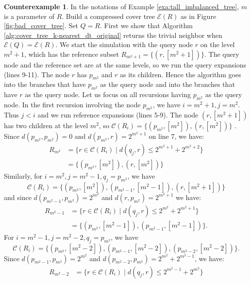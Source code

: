 \documentclass{vgtc}                          %
\numberwithin{algocf}{section}
\theoremstyle{definition}
\theoremstyle{definition}
\theoremstyle{definition}
\newtheorem{cexa}[algocf]{Counterexample}
\theoremstyle{plain}
\newcommand{\C}{\mathcal{C}}
\newcommand{\T}{\mathcal{E}}
\begin{document}
\begin{cexa}
	\label{cexa:dualtreecode}
	In the notations of  Example \ref{exa:tall_imbalanced_tree}, $m$ is a parameter of $R$.
	Build a compressed cover tree $\T(R)$ as in Figure \ref{fig:bad_cover_tree}. 
	Set $Q = R$. 
	First we show that Algorithm \ref{alg:cover_tree_k-nearest_dt_original} returns the trivial neighbor when $\T(Q)=\T(R)$. 
	\medskip
	\noindent
	We start the simulation with the query node $r$ on the level $m^2+1$, which has the reference subset $R_{m^2+1} = \{(r, [m^2+1])\}$. 
	The query node and the reference set are at the same levels, so we run the query expansions (lines 9-11). 
	The node $r$ has $p_{m^2}$ and $r$ as its children.
	Hence the algorithm goes into the branches that have $p_{m^2}$ as the query node and into the branches that have $r$ as the query node.
	\medskip
	\noindent
	Let us focus on all recursions having $p_{m^2}$ as the query node. In the first recursion involving the node $p_{m^2}$, we have $i = m^2+1, j = m^2$. Thus $j < i$ and we run reference expansions (lines 5-9). 
	The node $(r, [m^2+1])$ has two children at the level $m^2$, so $\C(R_i) = \{(p_{m^2}, [m^2]), (r, [m^2])\}$ . Since
	$d(p_{m^2},p_{m^2}) = 0$ and $d(p_{m^2}, r) = 2^{m^2+1}$ on line 7, we have:
	\begin{align*}
	    R_{m^2}  &= \{r \in \C(R_i) \mid d(q_j,r) \leq 2^{m^2 + 1} + 2^{m^2+2} \} \\
	    &= \{(p_{m^2}, [m^2]), (r, [m^2])\}
	\end{align*}
	Similarly, for $i = m^2, j = m^2-1, q_j = p_{m^2}$, we have 
	$$\C(R_i) =  \{ (p_{m^2}, [m^2]), (p_{m^2-1}, [m^2-1]), (r, [m^2+1])\}$$
	and since $d(p_{m^2 - 1}, p_{m^2}) = 2^{m^2}$ and $d(r,p_{m^2}) = 2^{m^2 + 1}$ we have:
		\begin{align*}
	    R_{m^2-1} &=  \{r \in \C(R_i) \mid d(q_j,r) \leq 2^{m^2} + 2^{m^{2} + 1} \} \\
	    &=  \{(p_{m^2}, [m^2-1]), (p_{m^2-1}, [m^2-1])\}.
	\end{align*}
	For $i = m^2-1, j = m^2-2, q_j = p_{m^2}$, we have 
	$$\C(R_i) =  \{(p_{m^2}, [m^2-2]), (p_{m^2-1}, [m^2-2]), (p_{m^2-2}, [m^2-2])\}.$$
	Since $d(p_{m^2 - 1}, p_{m^2}) = 2^{m^2}$ and $d(p_{m^2-2},p_{m^2}) = 2^{m^2} + 2^{m^2-1}$, we have:
		\begin{align*}
	    R_{m^2-2} &=  \{r \in \C(R_i) \mid d(q_j,r) \leq 2^{m^2 - 1} + 2^{m^{2}} \}   \\

\end{align*}
\end{cexa}
\end{document}
